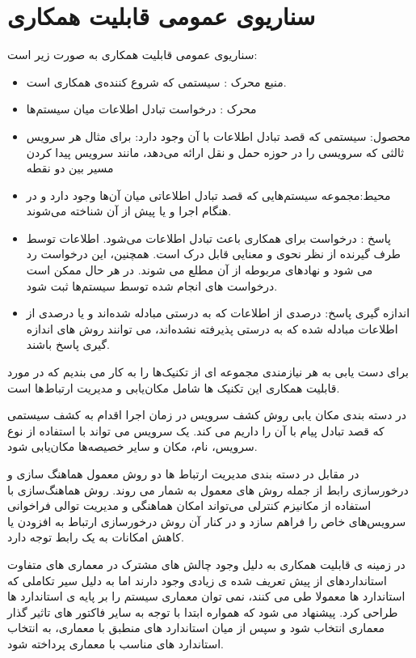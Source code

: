 \section{سناریوی عمومی قابلیت همکاری}
سناریو‌ی عمومی قابلیت همکاری به صورت زیر است:
\begin{itemize}
\item
منبع محرک : سیستمی که شروع کننده‌ی همکاری است.
\item
محرک : در‌خواست تبادل اطلاعات میان سیستم‌ها
\item
محصول: سیستمی که قصد تبادل اطلاعات با آن وجود دارد: برای مثال هر سرویس ثالثی که سرویسی را در حوزه حمل و نقل ارائه می‌دهد، مانند سرویس پیدا کردن مسیر بین دو نقطه
\item
محیط:مجموعه سیستم‌هایی که قصد تبادل اطلاعاتی میان آن‌ها وجود دارد و در هنگام اجرا و یا پیش از آن شناخته می‌شوند.
\item
پاسخ : درخواست برای همکاری باعث تبادل اطلاعات می‌شود. اطلاعات توسط طرف گیرنده از نظر نحوی و معنایی قابل درک است. همچنین، این درخواست رد می شود و نهادهای مربوطه از آن مطلع می شوند. در هر حال ممکن است درخواست های انجام شده توسط سیستم‌ها ثبت شود.
\item
اندازه گیری پاسخ: درصدی از اطلاعات که به درستی مبادله شده‌اند و یا درصدی از اطلاعات مبادله شده که به درستی پذیرفته نشده‌اند، می توانند روش های اندازه گیری پاسخ باشند.
\end{itemize}

برای دست یابی به هر نیازمندی مجموعه ای از تکنیک‌ها را به کار می بندیم که در مورد قابلیت همکاری این تکنیک ها شامل مکان‌یابی  و مدیریت ارتباط‌ها  است.

در دسته بندی مکان یابی روش 	کشف سرویس  در زمان اجرا اقدام به کشف سیستمی که قصد تبادل پیام با آن را داریم می کند. یک سرویس می تواند با استفاده از نوع سرویس،‌ نام،‌ مکان و سایر خصیصه‌ها مکان‌یابی شود.

در مقابل در دسته بندی مدیریت ارتباط ها دو روش معمول هماهنگ سازی و درخور‌سازی رابط از جمله روش های معمول به شمار می روند. روش هماهنگ‌سازی  با استفاده از مکانیزم کنترلی می‌تواند امکان هماهنگی و مدیریت توالی فراخوانی سرویس‌های خاص را فراهم سازد و در کنار آن روش درخورسازی ارتباط به افزودن یا کاهش امکانات به یک رابط توجه دارد.

در زمینه ی قابلیت همکاری به دلیل وجود چالش های مشترک در معماری های متفاوت استاندارد‌های از پیش تعریف شده ی زیادی وجود دارند اما به دلیل سیر تکاملی که استاندارد ها معمولا طی می کنند، نمی توان معماری سیستم را بر پایه ی استاندارد ها طراحی کرد. پیشنهاد می شود که همواره ابتدا با توجه به سایر فاکتور های تاثیر گذار معماری انتخاب شود و سپس از میان استاندارد های منطبق با معماری،‌ به انتخاب استاندارد های مناسب با معماری پرداخته شود.

